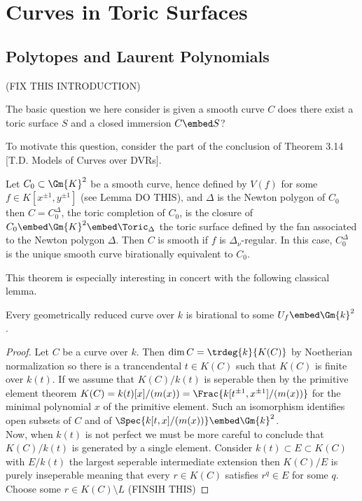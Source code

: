 \documentclass[12pt]{article}
\begin{document}
\tableofcontents

\section{Curves in Toric Surfaces}

\subsection{Polytopes and Laurent Polynomials}

(FIX THIS INTRODUCTION)

\begin{rmk}
The basic question we here consider is given a smooth curve $C$ does there exist a toric surface $S$ and a closed immersion $C \embed S$?
\end{rmk}

\begin{rmk}
To motivate this question, consider the part of the conclusion of Theorem 3.14 [T.D. Models of Curves over DVRs].
\end{rmk}

\begin{theorem}
Let $C_0 \subset \Gm{K}^2$ be a smooth curve, hence defined by $V(f)$ for some $f \in K[x^{\pm 1}, y^{\pm 1}]$ (see Lemma DO THIS), and $\Delta$ is the Newton polygon of $C_0$ then $C = C_0^\Delta$, the toric completion of $C_0$, is the closure of $C_0 \embed \Gm{K}^2 \embed \Toric_\Delta$ the toric surface defined by the fan associated to the Newton polygon $\Delta$. Then $C$ is smooth if $f$ is $\Delta_\nu$-regular. In this case, $C_0^\Delta$ is the unique smooth curve birationally equivalent to $C_0$.  
\end{theorem}

\begin{rmk}
This theorem is especially interesting in concert with the following classical lemma.
\end{rmk}

\begin{lemma}
Every geometrically reduced curve over $k$ is birational to some $U_f \embed \Gm{k}^2$.
\end{lemma}

\begin{proof}
Let $C$ be a curve over $k$. Then $\dim{C} = \trdeg{k}{K(C)}$ by Noetherian normalization so there is a trancendental $t \in K(C)$ such that $K(C)$ is finite over $k(t)$. If we assume that $K(C)  / k(t)$ is seperable then by the primitive element theorem $K(C) = k(t)[x]/(m(x)) = \Frac{k[t^{\pm 1}, x^{\pm 1}]/(m(x))}$ for the minimal polynomial $x$ of the primitive element. Such an isomorphism identifies open subsets of $C$ and of $\Spec{k[t, x]/(m(x))} \embed \Gm{k}^2$. 
\bigskip\\
Now, when $k(t)$ is not perfect we must be more careful to conclude that $K(C) / k(t)$ is generated by a single element. Consider $k(t) \subset E \subset K(C)$ with $E / k(t)$ the largest seperable intermediate extension then $K(C) / E$ is purely inseperable meaning that every $r \in K(C)$ satisfies $r^q \in E$ for some $q$. Choose some $r \in K(C) \setminus L$ 
(FINSIH THIS)
\end{proof}
\end{document}
